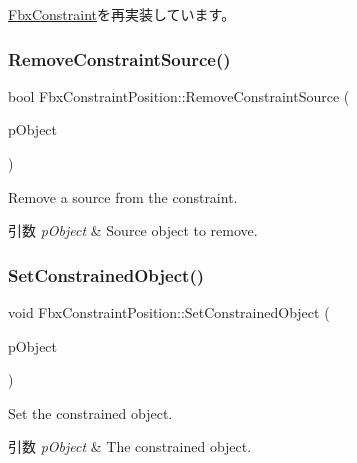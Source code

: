 \hyperlink{class_fbx_constraint_adbeea66a1a605531a019aa6df90dc45b}{Fbx\+Constraint}を再実装しています。

\mbox{\label{class_fbx_constraint_position_a7d496553504b797425ca2a055212f2ad}} 
\subsubsection{\texorpdfstring{Remove\+Constraint\+Source()}{RemoveConstraintSource()}}
{\footnotesize\ttfamily bool Fbx\+Constraint\+Position\+::\+Remove\+Constraint\+Source (\begin{DoxyParamCaption}\item[{\hyperlink{class_fbx_object}{Fbx\+Object} $\ast$}]{p\+Object }\end{DoxyParamCaption})}

Remove a source from the constraint. 
\begin{DoxyParams}{引数}
{\em p\+Object} & Source object to remove. \\
\hline
\end{DoxyParams}
\mbox{\label{class_fbx_constraint_position_a7a2604a668ec7cc7d0c04fd9cf29a01a}} 
\subsubsection{\texorpdfstring{Set\+Constrained\+Object()}{SetConstrainedObject()}}
{\footnotesize\ttfamily void Fbx\+Constraint\+Position\+::\+Set\+Constrained\+Object (\begin{DoxyParamCaption}\item[{\hyperlink{class_fbx_object}{Fbx\+Object} $\ast$}]{p\+Object }\end{DoxyParamCaption})}

Set the constrained object. 
\begin{DoxyParams}{引数}
{\em p\+Object} & The constrained object. \\
\hline
\end{DoxyParams}


